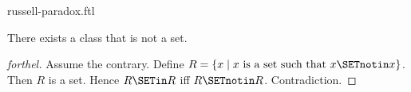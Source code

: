 \documentclass{naproche-library}
\begin{document}
\begin{smodule}[title=Russell's Paradox]{russell-paradox.ftl}

\begin{theorem}[forthel,title=Russell's Paradox,id=russell_paradox]
  There exists a class that is not a set.
\end{theorem}
\begin{proof}[forthel]
  Assume the contrary.
  Define $R = \{x \mid x\text{ is a set such that }x \SETnotin x\}$.
  Then $R$ is a set.
  Hence $R \SETin R$ iff $R \SETnotin R$.
  Contradiction.
\end{proof}
\end{smodule}
\end{document}
